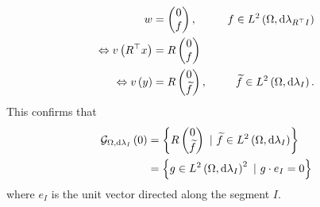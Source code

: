 \begin{align*}
	w &= \begin{pmatrix} 0 \\ f \end{pmatrix}, &\quad f\in L^{2}\left( \Omega,\mathrm{d}\lambda_{R^{\top}I} \right) \\
	\Leftrightarrow v\left( R^{\top}x \right) &= R\begin{pmatrix} 0 \\ f \end{pmatrix} &\\
	\Leftrightarrow v\left( y \right) &= R\begin{pmatrix} 0 \\ \widetilde{f} \end{pmatrix}, &\quad \widetilde{f}\in L^{2}\left( \Omega,\mathrm{d}\lambda_I \right).
\end{align*}
This confirms that 
\begin{align*}
	\gradZero{\ddom}{\lambda_I} &= \clbracs{R\begin{pmatrix} 0 \\ \widetilde{f} \end{pmatrix} \ \vert \ \widetilde{f}\in\ltwo{\ddom}{\lambda_I}} \\
	&= \clbracs{g\in\ltwo{\ddom}{\lambda_I}^2 \ \vert \ g\cdot e_{I} = 0}
\end{align*}
where $e_I$ is the unit vector directed along the segment $I$.

